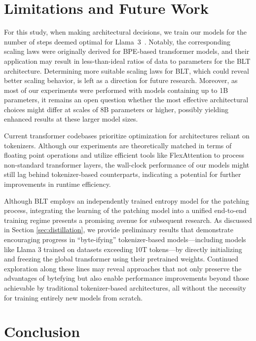 \section{Limitations and Future Work}

For this study, when making architectural decisions, we train our models for the number of steps deemed optimal for Llama~3~\citep{dubey2024llama}. Notably, the corresponding scaling laws were originally derived for BPE-based transformer models, and their application may result in less-than-ideal ratios of data to parameters for the {\textsc BLT} architecture. Determining more suitable scaling laws for {\textsc BLT}, which could reveal better scaling behavior, is left as a direction for future research. Moreover, as most of our experiments were performed with models containing up to 1B parameters, it remains an open question whether the most effective architectural choices might differ at scales of 8B parameters or higher, possibly yielding enhanced results at these larger model sizes.

Current transformer codebases prioritize optimization for architectures reliant on tokenizers. Although our experiments are theoretically matched in terms of floating point operations and utilize efficient tools like FlexAttention to process non-standard transformer layers, the wall-clock performance of our models might still lag behind tokenizer-based counterparts, indicating a potential for further improvements in runtime efficiency.

Although {\textsc BLT} employs an independently trained entropy model for the patching process, integrating the learning of the patching model into a unified end-to-end training regime presents a promising avenue for subsequent research. As discussed in Section \ref{sec:distillation}, we provide preliminary results that demonstrate encouraging progress in “byte-ifying” tokenizer-based models—including models like Llama 3 trained on datasets exceeding 10T tokens—by directly initializing and freezing the global transformer using their pretrained weights. Continued exploration along these lines may reveal approaches that not only preserve the advantages of bytefying but also enable performance improvements beyond those achievable by traditional tokenizer-based architectures, all without the necessity for training entirely new models from scratch.

\section{Conclusion}
\label{section:conclusion}

